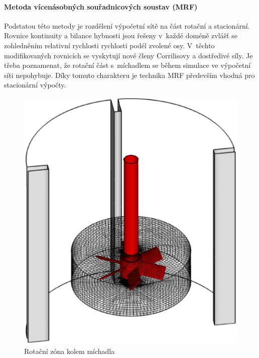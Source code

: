 \paragraph{Metoda vícenásobných souřadnicových soustav (MRF)}
Podstatou této metody je rozdělení výpočetní sítě na část rotační a stacionární. Rovnice kontinuity a bilance hybnosti jsou řešeny v~každé doméně zvlášť se zohledněním relativní rychlosti rychlosti podél zvolené osy. V~těchto modifikovaných rovnicích se vyskytují nové členy  Corrilisovy a dostředivé síly. Je třeba poznamenat, že rotační část s~míchadlem se během simulace ve výpočetní síti nepohybuje. Díky tomuto charakteru je technika MRF především vhodná pro stacionární výpočty.

\begin{figure}[h!]
\centering
  \includegraphics[scale=0.35]{images/sm.eps}
  \caption{Rotační zóna kolem míchadla}
  \label{fig:mrf}
\end{figure} 

